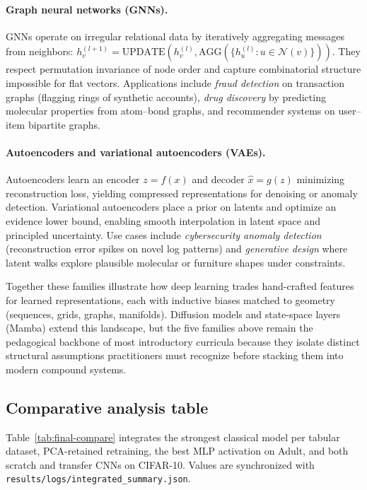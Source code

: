 \documentclass[11pt,a4paper]{article}
\begin{document}
\paragraph{Graph neural networks (GNNs).}
GNNs operate on irregular relational data by iteratively aggregating messages from neighbors: $h_v^{(l+1)} = \mathrm{UPDATE}(h_v^{(l)}, \mathrm{AGG}(\{h_u^{(l)}: u \in \mathcal{N}(v)\}))$.
They respect permutation invariance of node order and capture combinatorial structure impossible for flat vectors.
Applications include \emph{fraud detection} on transaction graphs (flagging rings of synthetic accounts), \emph{drug discovery} by predicting molecular properties from atom--bond graphs, and recommender systems on user--item bipartite graphs.

\paragraph{Autoencoders and variational autoencoders (VAEs).}
Autoencoders learn an encoder $z=f(x)$ and decoder $\hat{x}=g(z)$ minimizing reconstruction loss, yielding compressed representations for denoising or anomaly detection.
Variational autoencoders place a prior on latents and optimize an evidence lower bound, enabling smooth interpolation in latent space and principled uncertainty.
Use cases include \emph{cybersecurity anomaly detection} (reconstruction error spikes on novel log patterns) and \emph{generative design} where latent walks explore plausible molecular or furniture shapes under constraints.

Together these families illustrate how deep learning trades hand-crafted features for learned representations, each with inductive biases matched to geometry (sequences, grids, graphs, manifolds).
Diffusion models and state-space layers (Mamba) extend this landscape, but the five families above remain the pedagogical backbone of most introductory curricula because they isolate distinct structural assumptions practitioners must recognize before stacking them into modern compound systems.

\subsection{Comparative analysis table}
Table~\ref{tab:final-compare} integrates the strongest classical model per tabular dataset, PCA-retained retraining, the best MLP activation on Adult, and both scratch and transfer CNNs on CIFAR-10.
Values are synchronized with \texttt{results/logs/integrated\_summary.json}.
\end{document}
